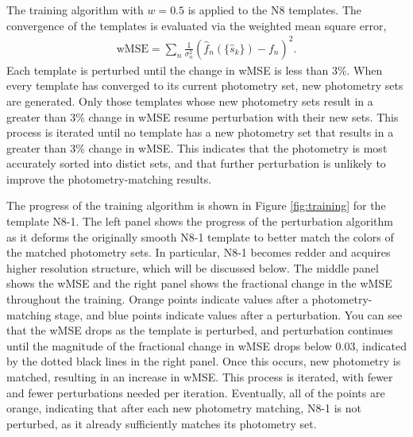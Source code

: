 The training algorithm with $w=0.5$ is applied to the N8 templates.
The convergence of the templates is evaluated via the weighted mean square error,
\begin{align}
    \text{wMSE} = \sum_n \frac{1}{\sigma_n^2}(\hat{f}_n(\{\hat{s}_k\}) - f_n)^2.
\end{align}
Each template is perturbed until the change in wMSE is less than 3\%.
When every template has converged to its current photometry set, new photometry sets are generated.
Only those templates whose new photometry sets result in a greater than 3\% change in wMSE resume perturbation with their new sets.
This process is iterated until no template has a new photometry set that results in a greater than 3\% change in wMSE.
This indicates that the photometry is most accurately sorted into distict sets, and that further perturbation is unlikely to improve the photometry-matching results.

The progress of the training algorithm is shown in Figure \ref{fig:training} for the template N8-1.
The left panel shows the progress of the perturbation algorithm as it deforms the originally smooth N8-1 template to better match the colors of the matched photometry sets.
In particular, N8-1 becomes redder and acquires higher resolution structure, which will be discussed below.
The middle panel shows the wMSE and the right panel shows the fractional change in the wMSE throughout the training.
Orange points indicate values after a photometry-matching stage, and blue points indicate values after a perturbation.
You can see that the wMSE drops as the template is perturbed, and perturbation continues until the magnitude of the fractional change in wMSE drops below 0.03, indicated by the dotted black lines in the right panel.
Once this occurs, new photometry is matched, resulting in an increase in wMSE.
This process is iterated, with fewer and fewer perturbations needed per iteration.
Eventually, all of the points are orange, indicating that after each new photometry matching, N8-1 is not perturbed, as it already sufficiently matches its photometry set.

